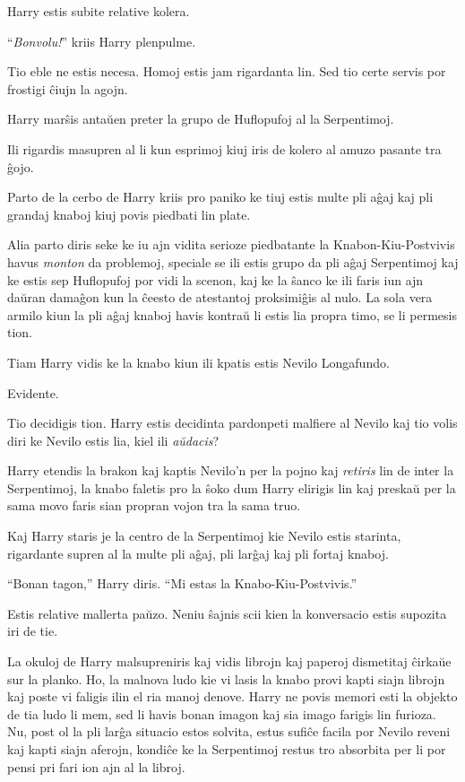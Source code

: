 Harry estis subite relative kolera.

``\emph{Bonvolu!}'' kriis Harry plenpulme.

Tio eble ne estis necesa. Homoj estis jam rigardanta lin. Sed tio certe servis
por frostigi ĉiujn la agojn.

Harry marŝis antaŭen preter la grupo de Huflopufoj al la Serpentimoj.

Ili rigardis masupren al li kun esprimoj kiuj iris de kolero al amuzo pasante
tra ĝojo.

Parto de la cerbo de Harry kriis pro paniko ke tiuj estis multe pli
aĝaj kaj pli grandaj knaboj kiuj povis piedbati lin plate.

Alia parto diris seke ke iu ajn vidita serioze piedbatante la
Knabon-Kiu-Postvivis havus \emph{monton} da problemoj, speciale se ili estis
grupo da pli aĝaj Serpentimoj kaj ke estis sep Huflopufoj por vidi la scenon,
kaj ke la ŝanco ke ili faris iun ajn daŭran damaĝon kun la ĉeesto de atestantoj
proksimiĝis al nulo. La sola vera armilo kiun la pli aĝaj knaboj havis kontraŭ li
estis lia propra timo, se li permesis tion.

Tiam Harry vidis ke la knabo kiun ili kpatis estis Nevilo Longafundo.

Evidente.

Tio decidigis tion. Harry estis decidinta pardonpeti malfiere al Nevilo kaj tio
volis diri ke Nevilo estis lia, kiel ili \emph{aŭdacis}?

Harry etendis la brakon kaj kaptis Nevilo'n per la pojno kaj
\emph{retiris} lin de inter la Serpentimoj, la knabo faletis pro la
ŝoko dum Harry elirigis lin kaj preskaŭ per la sama movo faris
sian propran vojon tra la sama truo.

Kaj Harry staris je la centro de la Serpentimoj kie Nevilo estis
starinta, rigardante supren al la multe pli aĝaj, pli larĝaj kaj
pli fortaj knaboj.

``Bonan tagon,'' Harry diris. ``Mi estas la Knabo-Kiu-Postvivis.''

Estis relative mallerta paŭzo. Neniu ŝajnis scii kien la
konversacio estis supozita iri de tie.

La okuloj de Harry malsupreniris kaj vidis librojn kaj paperoj dismetitaj
ĉirkaŭe sur la planko. Ho, la malnova ludo kie vi lasis la knabo provi kapti
siajn librojn kaj poste vi faligis ilin el ria manoj denove. Harry ne povis
memori esti la objekto de tia ludo li mem, sed li havis bonan imagon kaj sia
imago farigis lin furioza. Nu, post ol la pli larĝa situacio estos solvita,
estus sufiĉe facila por Nevilo reveni kaj kapti siajn aferojn, kondiĉe ke la
Serpentimoj restus tro absorbita per li por pensi pri fari ion ajn al la libroj.

